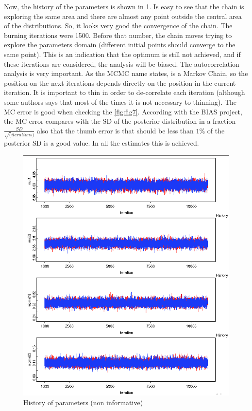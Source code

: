 \documentclass{article}
\begin{document}
\pagebreak
Now, the history of the parameters is shown in \cref{fig:fig6}. Is easy to see that the chain is exploring the same area and there are almost any point outside the central area of the distributions. So, it looks very good the convergence of the chain. The burning iterations were 1500. Before that number, the chain moves trying to explore the parameters domain (different initial points should converge to the same point). This is an indication that the optimum is still not achieved, and if these iterations are considered, the analysis will be biased. The autocorrelation analysis is very important. As the MCMC name states, is a Markov Chain, so the position on the next iterations depends directly on the position in the current iteration. It is important to thin in order to de-correlate each iteration (although some authors says that most of the times it is not necessary to thinning). The MC error is good when checking the \cref{fig:fig7}. According with the BIAS project, the MC error compares with the SD of the posterior distribution in a fraction $\frac{SD}{\sqrt(iterations)}$ also that the thumb error is that should be less than $1\%$ of the posterior SD is a good value. In all the estimates this is achieved. 

\begin{figure}[ht!]
  \centering
  \includegraphics[width=.8\textwidth]{imgs/NonInf_hist.png}
  \caption{History of parameters (non informative)}
  \label{fig:fig6}
\end{figure}
\end{document}
